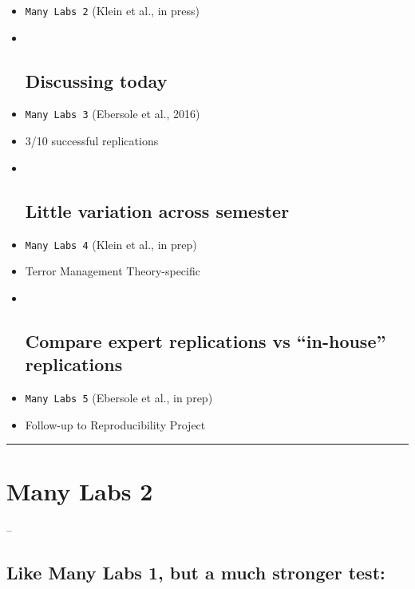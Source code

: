 \documentclass[]{article}
\begin{document}
\begin{itemize}
\item
  \texttt{Many\ Labs\ 2} (Klein et al., in press)
\item ~
  \subsection{Discussing today}\label{discussing-today}
\item
  \texttt{Many\ Labs\ 3} (Ebersole et al., 2016)
\item
  3/10 successful replications
\item ~
  \subsection{Little variation across
  semester}\label{little-variation-across-semester}
\item
  \texttt{Many\ Labs\ 4} (Klein et al., in prep)
\item
  Terror Management Theory-specific
\item ~
  \subsection{\texorpdfstring{Compare expert replications vs
  ``in-house''
  replications}{Compare expert replications vs in-house replications}}\label{compare-expert-replications-vs-in-house-replications}
\item
  \texttt{Many\ Labs\ 5} (Ebersole et al., in prep)
\item
  Follow-up to Reproducibility Project
\end{itemize}

\begin{center}\rule{0.5\linewidth}{\linethickness}\end{center}

\section{Many Labs 2}\label{many-labs-2-1}

--

\subsection{Like Many Labs 1, but a much stronger
test:}\label{like-many-labs-1-but-a-much-stronger-test}
\end{document}
